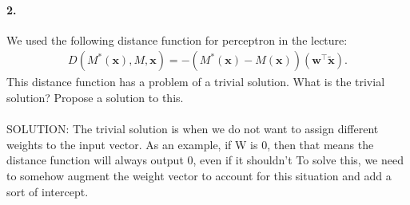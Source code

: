 \documentclass{article}
\newcommand{\vect}[1]{\mathbf{#1}}
\newcommand{\vx}[0]{\vect{x}}
\newcommand{\vw}[0]{\vect{w}}
\begin{document}
\vspace{5mm}

\paragraph{2.} We used the following distance function for perceptron in the
lecture:
\begin{align*}
    D(M^*(\vx), M, \vx) = -\left( M^*(\vx) - M(\vx)
    \right) \left(\vw^\top
    \tilde{\vx}\right).
\end{align*}
This distance function has a problem of a trivial solution. What is the trivial
solution? Propose a solution to this.
\\
\\
SOLUTION: The trivial solution is when we do not want to assign different weights to the input vector. As an example, if W is 0, then that means the distance function will always output 0, even if it shouldn't To solve this, we need to somehow augment the weight vector to account for this situation and add a sort of intercept.

\vspace{5mm}
\end{document}
